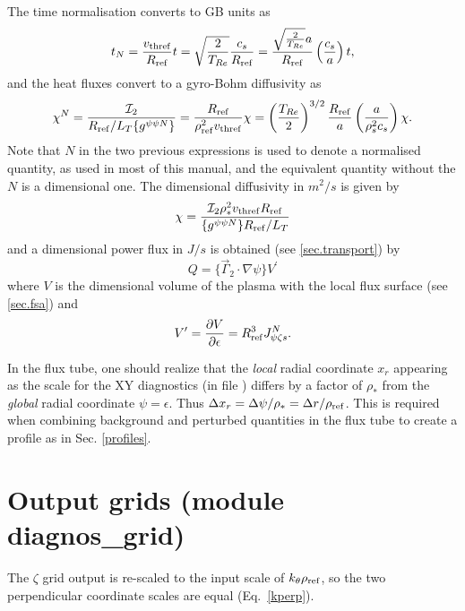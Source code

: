 The time normalisation converts to GB units as
\begin{equation}
t_N = {v_{\rm thref} \over R_{\rm ref}} t = \sqrt{2 \over T_{Re}}{c_s \over R_{\rm ref}}
 = {\sqrt{2 \over T_{Re}} a \over R_{\rm ref}} \left({c_s \over a}\right) t ,
\end{equation}
and the heat fluxes convert to a gyro-Bohm diffusivity as 
\begin{equation}
\chi^N={{\cal I}_2 \over R_{\rm ref}/L_T \{g^{\psi \psi N}\}}={R_{\rm ref} \over \rho_{\rm ref}^2 v_{\rm thref}} \chi 
= \left({T_{Re} \over 2}\right)^{3/2}{R_{\rm ref} \over a}\left({a \over \rho_s^2 c_s}\right) \chi .
\end{equation}
Note that $N$ in the two previous expressions is used to denote a normalised quantity, as used in most of this
manual, and the equivalent quantity without the $N$ is a dimensional one.  The dimensional diffusivity in $m^2 /s$ 
is given by \begin{equation}
\chi=\frac{{\cal I}_2  \rho_*^2 v_{\rm thref} R_{\rm ref}}{\{g^{\psi \psi N}\} R_{\rm ref}/L_T}
\end{equation}
and a dimensional power flux in $J/s$ is obtained (see \ref{sec.transport}) by
\begin{equation}
Q = \{\vec{\Gamma}_2 \cdot \nabla \psi\} V^\prime
\end{equation}
where $V$ is the dimensional volume of the plasma with the local flux surface (see \ref{sec.fsa}) and
\begin{equation}
V^\prime = {\partial V \over \partial \epsilon} = R_{\rm ref}^3 J^N_{\psi \zeta s}.
\end{equation} 

In the flux tube, one should realize that the \textit{local} radial coordinate $x_r$ appearing as the scale for the XY diagnostics (in file ) differs by a factor of $\rho_*$ from the \textit{global} radial coordinate $\psi=\epsilon$.  Thus $\Delta x_r = \Delta \psi / \rho_* = \Delta r / \rho_{\rm ref}$.  This is required when combining background and perturbed quantities in the flux tube to create a profile as in Sec. \ref{profiles}.

\section{Output grids (module diagnos_grid)}

The $\zeta$ grid output is re-scaled to the input scale of $k_\theta
\rho_{\rm ref}$, so the two perpendicular coordinate scales are equal
(Eq.~\ref{kperp}).

